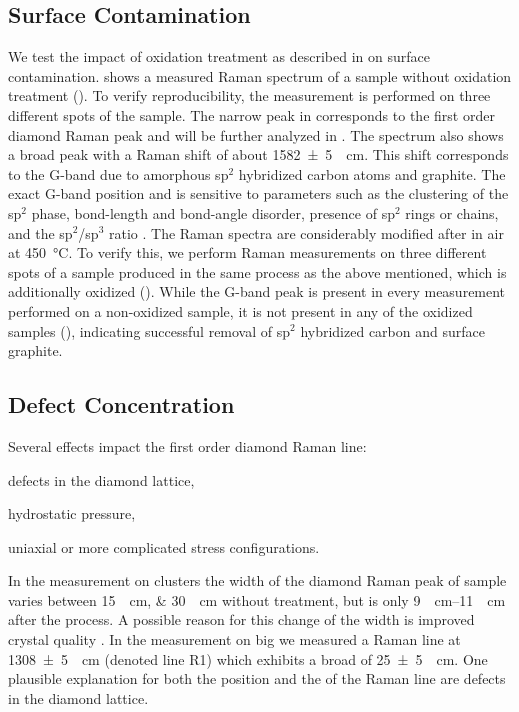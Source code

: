 			\subsection{Surface Contamination}\label{subsec::raman_surface_contamination}

				We test the impact of oxidation treatment as described in  on surface contamination.
				 shows a measured Raman spectrum of a sample without oxidation treatment (\insituSn).
				To verify reproducibility, the measurement is performed on three different spots of the sample.
				The narrow peak in  corresponds to the first order diamond Raman peak and will be further analyzed in .
				The spectrum also shows a broad peak with a Raman shift of about \SI[separate-uncertainty]{1582+-5}{\per\centi\meter}.
				This shift corresponds to the G-band due to amorphous sp$^2$ hybridized carbon atoms and graphite.
				The exact G-band position and \lw is sensitive to parameters such as the clustering of the sp$^2$ phase, bond-length and bond-angle disorder, presence of sp$^2$ rings or chains, and the sp$^2$/sp$^3$ ratio \cite{Ferrari2004}.
				The \nd Raman spectra are considerably modified after \ox in air at \SI{450}{\degreeCelsius}.
				To verify this, we perform Raman measurements on three different spots of a sample produced in the same process as the above mentioned, which is additionally oxidized (\insituSo).
				While the G-band peak is present in every measurement performed on a non-oxidized sample, it is not present in any of the oxidized samples (), indicating successful removal of sp$^2$ hybridized carbon and surface graphite.

			\subsection{Defect Concentration}\label{subsec::raman_defect_concentration}
				Several effects impact the first order diamond Raman line:
				\begin{enumerate*}
					\item defects in the diamond lattice,
					\item hydrostatic pressure,
					\item uniaxial or more complicated stress configurations.
				\end{enumerate*}
				In the measurement on \nd clusters the width of the diamond Raman peak of sample \insituS varies between \SIlist{15; 30}{\per\centi\meter} without \ox treatment, but is only \SIrange{9}{11}{\per\centi\meter} after the \ox process.
				A possible reason for this change of the width is improved crystal quality \cite{Prawer2004}.
				In the measurement on big \nds we measured a Raman line at \SI[separate-uncertainty]{1308+-5}{\per\centi\meter} (denoted line R1) which exhibits a broad \lw of \SI[separate-uncertainty]{25+-5}{\per\centi\meter}.
				One plausible explanation for both the position and the \lw of the Raman line are defects in the diamond lattice\cite{Prawer2004}.

